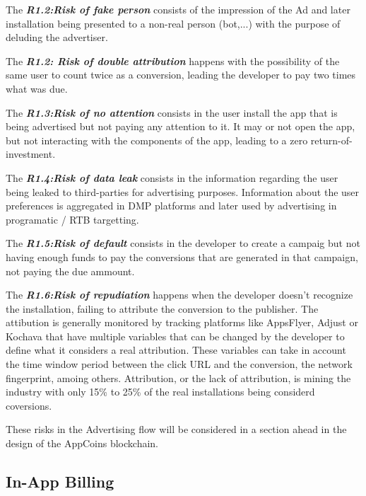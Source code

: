 \begin{tcolorbox}[enhanced jigsaw,sharp corners, drop fuzzy shadow=ShadowColor]

The {\bf\em R1.2:Risk of fake person} consists of the impression of the Ad and later installation being presented to a non-real person (bot,...) with the purpose of deluding the advertiser.


The {\bf\em R1.2: Risk of double attribution} happens with the possibility of the same user to count twice as a conversion, leading the developer to pay two times what was due.


The {\bf\em R1.3:Risk of no attention}  consists in the user install the app that is being advertised but not paying any attention to it. It may or not open the app, but not interacting with the components of the app, leading to a zero return-of-investment.


The {\bf\em R1.4:Risk of data leak} consists in the information regarding the user being leaked to third-parties for advertising purposes. Information about the user preferences is aggregated in DMP platforms and later used by advertising in programatic / RTB targetting.


The {\bf\em R1.5:Risk of default} consists in the developer to create a campaig but not having enough funds to pay the conversions that are generated in that campaign, not paying the due ammount.


The {\bf\em R1.6:Risk of repudiation} happens when the developer doesn't recognize the installation, failing to attribute the conversion to the publisher. The attibution is generally monitored by tracking platforms like AppsFlyer, Adjust or Kochava that have multiple variables that can be changed by the developer to define what it considers a real attribution. These variables can take in account the time window period between the click URL and the conversion, the network fingerprint, amoing others. Attribution, or the lack of attribution, is mining the industry with only 15\% to 25\% of the real installations being considerd coversions.

\end{tcolorbox}

These risks in the Advertising flow will be considered in a section ahead in the design of the AppCoins blockchain.


\subsection{In-App Billing}

